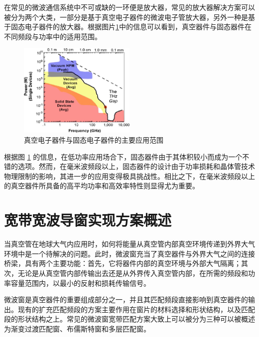 \documentclass[master]{thesis-uestc}
\begin{document}
在常见的微波通信系统中不可或缺的一环便是放大器，常见的放大器解决方案可以被分为两个大类，一部分是基于真空电子器件的微波电子管放大器，另外一种是基于固态电子器件的放大器。根据图片\ref{fig:真空电子器件与固态电子器件的主要应用范围}中的信息可以看到，真空器件与固态器件在不同频段与功率中的适用范围。
\begin{figure}[!htb]
    \centering
    \includegraphics[width=0.5\textwidth]{pic/chapter1/器件平均功率-频率示意图.png}
    \caption{真空电子器件与固态电子器件的主要应用范围}
    \label{fig:真空电子器件与固态电子器件的主要应用范围}
\end{figure}

根据图 \ref{fig:真空电子器件与固态电子器件的主要应用范围} 的信息，在低功率应用场合下，固态器件由于其体积较小而成为一个不错的选项。然而，在毫米波频段以上，固态器件的设计由于功率损耗和晶体管技术物理限制的影响，其进一步的应用变得极具挑战性。相比之下，在毫米波频段以上的真空器件所具备的高平均功率和高效率特性则显得尤为重要。


\section{宽带宽波导窗实现方案概述}
当真空管在地球大气内应用时，如何将能量从真空管内部真空环境传递到外界大气环境中是一个待解决的问题。此时，微波窗充当了真空器件与外界大气之间的连接桥梁，具有两个主要功能：首先，它将器件内部的真空环境与外部大气隔离；其次，无论是从真空管内部传输出去还是从外界传入真空管内部，在所需的频段和功率容量范围内，以最小的反射和损耗传输信号。

微波窗是真空器件的重要组成部分之一，并且其匹配频段直接影响到真空器件的输出。现有的扩充匹配频段的方案主要作用在窗片的材料选择和形状结构，以及匹配段的形状结构之上。常见的微波窗宽带匹配方案大致上可以被分为三种可以被概述为渐变过渡匹配窗、布儒斯特窗和多层匹配窗。
\end{document}
